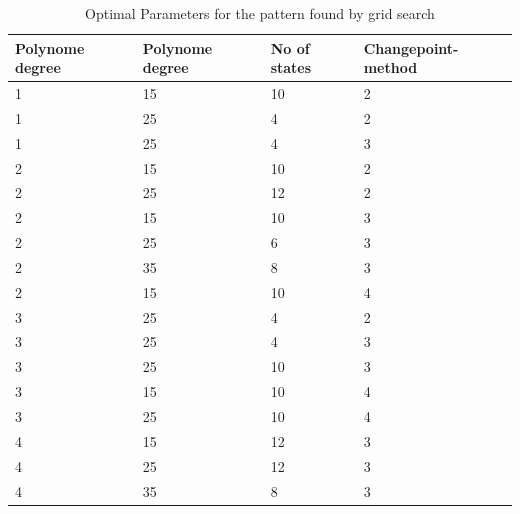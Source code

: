 \documentclass{article}
\begin{document}
\begin{table}[t]
  \caption{Optimal Parameters for the pattern found by grid search}
  \label{sample-table}
  \centering
  \begin{tabular}{llll}
    \toprule
    Polynome degree     & Polynome degree     & No of states &  Changepoint-method \\
    \midrule
     1  &  15  & 10 &    2 \\
     1  &  25  &   4 &    2 \\
     1  &  25  &   4  &   3  \\
     2  &  15  &  10   &  2  \\
     2  &  25  &  12&     2  \\
     2  &  15  &  10 &    3 \\
     2  &  25  &   6  &   3  \\
     2  &  35  &   8   &  3 \\
     2  &  15  &  10    & 4 \\
     3  &  25  &   4&     2 \\
     3  &  25  &  4  &   3  \\
     3  &  25  &  10  &   3   \\ 
     3  &  15  & 10    & 4    \\
     3  &  25  &  10    & 4     \\
     4  &  15  &  12     &3 \\
     4  &  25  &  12&     3   \\
     4  &  35  &   8 &    3  \\
    \bottomrule
  \end{tabular}
\end{table}
\end{document}
